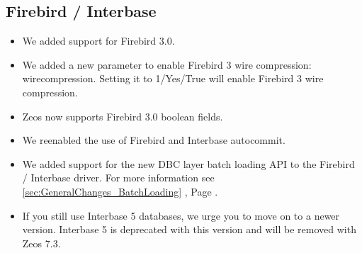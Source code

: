 \documentclass[a4paper,12pt,oneside]{article}
\begin{document}
\subsection{Firebird / Interbase}
\label{sec:DriverSpecificChanges_FirebirdInterbase}
\begin{itemize}
\item We added support for Firebird 3.0.
\item 
  We added a new parameter to enable Firebird 3 wire compression: wirecompression.
	Setting it to 1/Yes/True will enable Firebird 3 wire compression.
\item 
  Zeos now supports Firebird 3.0 boolean fields.
\item
  We reenabled the use of Firebird and Interbase autocommit.
\item
  We added support for the new DBC layer batch loading API to the Firebird / Interbase driver.
	For more information see \ref{sec:GeneralChanges_BatchLoading} , Page \pageref{sec:GeneralChanges_BatchLoading}.
\item 
  If you still use Interbase 5 databases, we urge you to move on to a newer version.
	Interbase 5 is deprecated with this version and will be removed with Zeos 7.3.	
\end{itemize}
\end{document}
